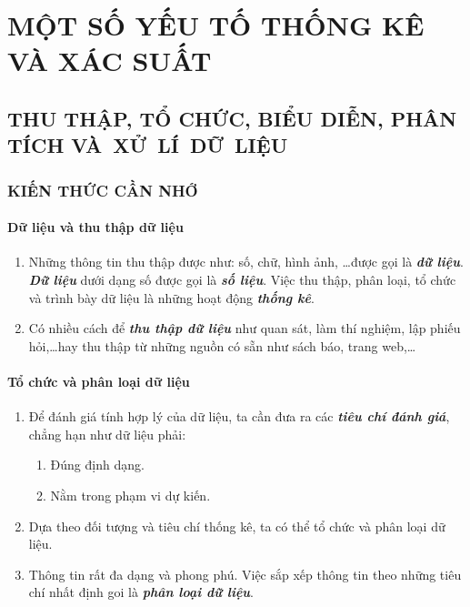 \def\i{\item}
\graphicspath{{../pictures/c5/}}

\chapter{MỘT SỐ YẾU TỐ THỐNG KÊ VÀ XÁC SUẤT}
\section{THU THẬP, TỔ CHỨC, BIỂU DIỄN, PHÂN TÍCH VÀ~XỬ~LÍ~DỮ~LIỆU}
\subsection{KIẾN THỨC CẦN NHỚ}
\subsubsection{Dữ liệu và thu thập dữ liệu}
\begin{enumerate}[--,leftmargin=*]
	\i Những thông tin thu thập được như: số, chữ, hình ảnh, \ldots được gọi là \textbf{\textit{dữ liệu}}. \textbf{\textit{Dữ liệu}} dưới dạng số được gọi là \textbf{\textit{số liệu}}. Việc thu thập, phân loại, tổ chức và trình bày dữ liệu là những hoạt động \textbf{\textit{thống kê}}.
	\i Có nhiều cách để \textbf{\textit{thu thập dữ liệu}} như quan sát, làm thí nghiệm, lập phiếu hỏi,\ldots hay thu thập từ những nguồn có sẵn như sách báo, trang web,\ldots
\end{enumerate}
\subsubsection{Tổ chức và phân loại dữ liệu}
\begin{enumerate}[--,leftmargin=*]
	\i Để đánh giá tính hợp lý của dữ liệu, ta cần đưa ra các \textbf{\textit{tiêu chí đánh giá}}, chẳng hạn như dữ liệu phải:
	\begin{enumerate}[+,leftmargin=*]
		\i Đúng định dạng.
		\i Nằm trong phạm vi dự kiến.
	\end{enumerate}
	\i Dựa theo đối tượng và tiêu chí thống kê, ta có thể tổ chức và phân loại dữ liệu.
	\i Thông tin rất đa dạng và phong phú. Việc sắp xếp thông tin theo những tiêu chí nhất định goi là \textbf{\textit{phân loại dữ liệu}}.
\end{enumerate}
